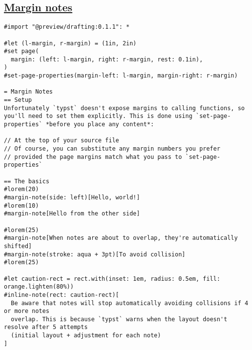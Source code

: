 \pandocbounded{}

\subsection{\texorpdfstring{\hyperref[margin-notes]{Margin
notes}}{Margin notes}}\label{margin-notes}

\begin{verbatim}
#import "@preview/drafting:0.1.1": *

#let (l-margin, r-margin) = (1in, 2in)
#set page(
  margin: (left: l-margin, right: r-margin, rest: 0.1in),
)
#set-page-properties(margin-left: l-margin, margin-right: r-margin)

= Margin Notes
== Setup
Unfortunately `typst` doesn't expose margins to calling functions, so you'll need to set them explicitly. This is done using `set-page-properties` *before you place any content*:

// At the top of your source file
// Of course, you can substitute any margin numbers you prefer
// provided the page margins match what you pass to `set-page-properties`

== The basics
#lorem(20)
#margin-note(side: left)[Hello, world!]
#lorem(10)
#margin-note[Hello from the other side]

#lorem(25)
#margin-note[When notes are about to overlap, they're automatically shifted]
#margin-note(stroke: aqua + 3pt)[To avoid collision]
#lorem(25)

#let caution-rect = rect.with(inset: 1em, radius: 0.5em, fill: orange.lighten(80%))
#inline-note(rect: caution-rect)[
  Be aware that notes will stop automatically avoiding collisions if 4 or more notes
  overlap. This is because `typst` warns when the layout doesn't resolve after 5 attempts
  (initial layout + adjustment for each note)
]
\end{verbatim}

\pandocbounded{}

